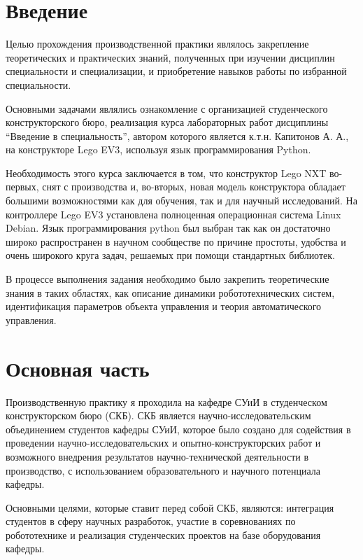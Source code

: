 \documentclass[a4paper,14pt]{extreport}
\begin{document}
	\tableofcontents
	\newpage
	\section*{Введение}
	
	Целью прохождения производственной практики являлось закрепление теоретических и практических знаний, полученных при изучении дисциплин специальности и специализации, и приобретение навыков работы по избранной специальности. 
	
	Основными задачами являлись ознакомление с организацией студенческого конструкторского бюро, реализация курса лабораторных работ дисциплины “Введение в специальность”, автором которого является к.т.н. Капитонов А. А., на конструкторе Lego EV3, используя язык программирования Python.
	
	Необходимость этого курса заключается в том, что конструктор Lego NXT во-первых, снят с производства и, во-вторых, новая модель конструктора обладает большими возможностями как для обучения, так и для научный исследований. На контроллере Lego EV3 установлена полноценная операционная система Linux Debian.
	Язык программирования python был выбран так как он достаточно широко распространен в научном сообществе по причине простоты, удобства и очень широкого круга задач, решаемых при помощи стандартных библиотек.
	
	В процессе выполнения задания необходимо было закрепить теоретические знания в таких областях, как описание динамики робототехнических систем, идентификация параметров объекта управления и теория автоматического управления. 
	
	\newpage
	\section*{Основная часть}
	
	Производственную практику я проходила на кафедре СУиИ в студенческом конструкторском бюро (СКБ). СКБ является научно-исследовательским объединением студентов кафедры СУиИ, которое было создано для содействия в проведении научно-исследовательских и опытно-конструкторских работ и возможного внедрения результатов научно-технической деятельности в производство, с использованием образовательного и научного потенциала кафедры.
	
	Основными целями, которые ставит перед собой СКБ, являются: интеграция студентов в сферу научных разработок, участие в соревнованиях по робототехнике и реализация студенческих проектов на базе оборудования кафедры.
	
\end{document}
